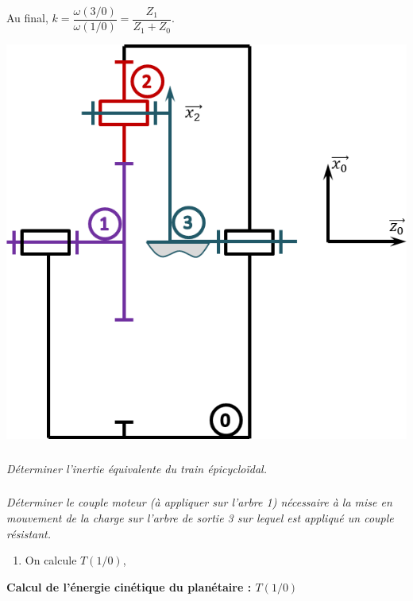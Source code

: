 \documentclass[10pt,fleqn]{article} %
\begin{document}
\begin{multicols}{2}
\begin{corrige}
\begin{minipage}[c]{.6\linewidth}
Au final, $k = \dfrac{\omega(3/0)}{\omega(1/0)} = \dfrac{Z_1}{Z_1+Z_0}$.
\end{minipage}\hfill
\begin{minipage}[c]{.35\linewidth}
\begin{center}
\includegraphics[width=\textwidth]{images/train_02}
\end{center}

\end{minipage}
\end{corrige}
\else
\fi

\subparagraph{}
\textit{Déterminer l'inertie équivalente du train épicycloïdal.}


\subparagraph{}
\textit{Déterminer le couple moteur (à appliquer sur l'arbre 1) nécessaire à la mise en mouvement de la charge sur l'arbre de sortie 3 sur lequel est appliqué un couple résistant. }


\ifprof
\begin{corrige}
\begin{methode}
\begin{enumerate}
\item On calcule $T(1/0)$, 
\end{enumerate}
\end{methode}
\textbf{Calcul de l'énergie cinétique du planétaire : $T(1/0)$}


\end{corrige}
\end{multicols}
\end{document}
